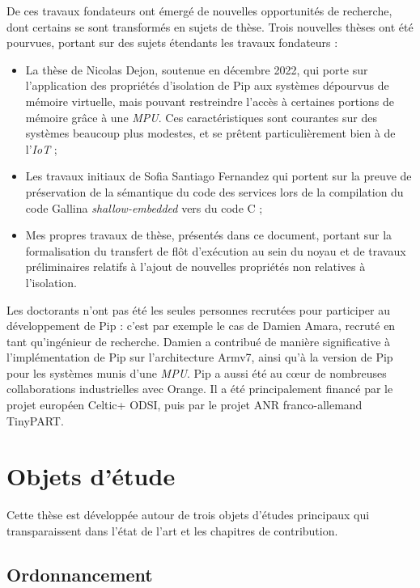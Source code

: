 De ces travaux fondateurs ont émergé de nouvelles opportunités de recherche, dont certains se sont transformés en sujets de thèse. Trois nouvelles thèses ont été pourvues, portant sur des sujets étendants les travaux fondateurs :
\begin{itemize}
	\item La thèse de Nicolas Dejon, soutenue en décembre 2022, qui porte sur l'application des propriétés d'isolation de Pip aux systèmes dépourvus de mémoire virtuelle, mais pouvant restreindre l'accès à certaines portions de mémoire grâce à une \emph{MPU}. Ces caractéristiques sont courantes sur des systèmes beaucoup plus modestes, et se prêtent particulièrement bien à de l'\emph{IoT} ;
	\item Les travaux initiaux de Sofia Santiago Fernandez qui portent sur la preuve de préservation de la sémantique du code des services lors de la compilation du code Gallina \emph{shallow-embedded} vers du code C ;
	\item Mes propres travaux de thèse, présentés dans ce document, portant sur la formalisation du transfert de flôt d'exécution au sein du noyau et de travaux préliminaires relatifs à l'ajout de nouvelles propriétés non relatives à l'isolation.
\end{itemize}

Les doctorants n'ont pas été les seules personnes recrutées pour participer au développement de Pip : c'est par exemple le cas de Damien Amara, recruté en tant qu'ingénieur de recherche. Damien a contribué de manière significative à l'implémentation de Pip sur l'architecture Armv7, ainsi qu'à la version de Pip pour les systèmes munis d'une \emph{MPU}. Pip a aussi été au cœur de nombreuses collaborations industrielles avec Orange. Il a été principalement financé par le projet européen Celtic+ ODSI, puis par le projet ANR franco-allemand TinyPART.

\section{Objets d'étude}

Cette thèse est développée autour de trois objets d'études principaux qui transparaissent dans l'état de l'art et les chapitres de contribution.

\subsection{Ordonnancement}


